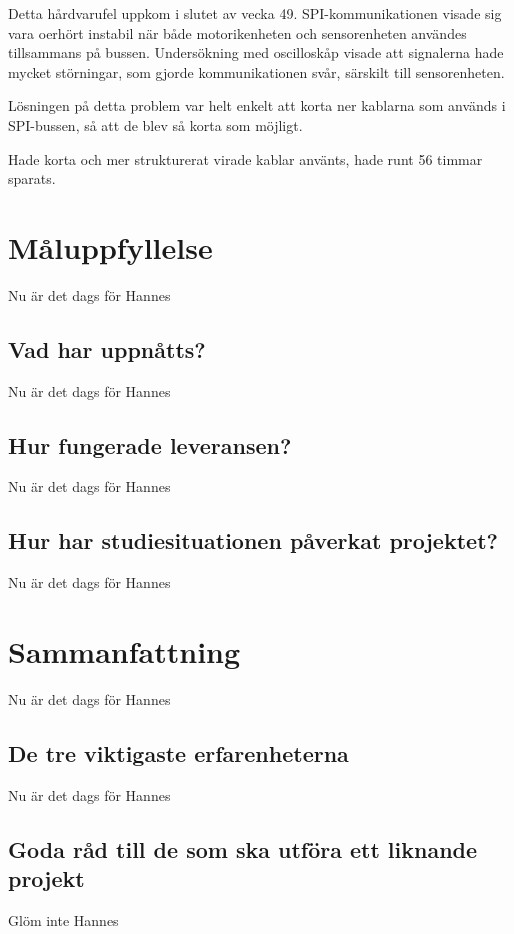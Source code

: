 \documentclass[a4paper,titlepage,12pt]{article}
\begin{document}
    Detta hårdvarufel uppkom i slutet av vecka 49. SPI-kommunikationen visade
    sig vara oerhört instabil när både motorikenheten och sensorenheten
    användes tillsammans på bussen. Undersökning med oscilloskåp visade att
    signalerna hade mycket störningar, som gjorde kommunikationen svår,
    särskilt till sensorenheten.

    Lösningen på detta problem var helt enkelt att korta ner kablarna som
    används i SPI-bussen, så att de blev så korta som möjligt.

    Hade korta och mer strukturerat virade kablar använts, hade runt 56 timmar
    sparats. %

	\section{Måluppfyllelse}
	Nu är det dags för Hannes
	
	\subsection{Vad har uppnåtts?}
	Nu är det dags för Hannes
	
	\subsection{Hur fungerade leveransen?}
	Nu är det dags för Hannes
	
	\subsection{Hur har studiesituationen påverkat projektet?}
	Nu är det dags för Hannes
	
	\section{Sammanfattning}
	Nu är det dags för Hannes
	
	\subsection{De tre viktigaste erfarenheterna}
	Nu är det dags för Hannes
	
	\subsection{Goda råd till de som ska utföra ett liknande projekt}
	Glöm inte Hannes
	
\end{document}
